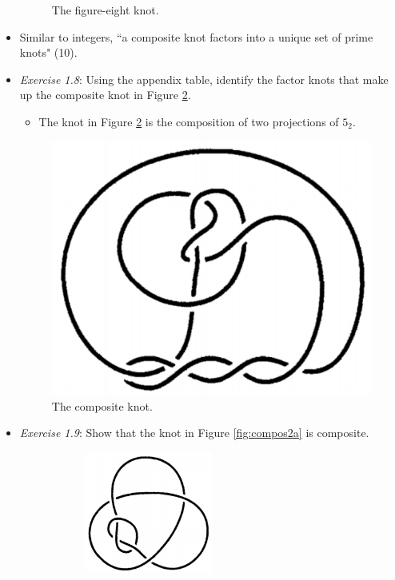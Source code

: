 \documentclass[titlepage]{article}
\numberwithin{figure}{section}
\numberwithin{table}{section}
\numberwithin{equation}{section}
\newcommand{\dq}[2]{``#1" (#2).}
\begin{document}
\begin{itemize}
\begin{figure}[h!]
        \caption{The figure-eight knot.}
        \label{fig:figure8knot}
    \end{figure}
    \item Similar to integers, \dq{a composite knot factors into a unique set of prime knots}{10}
    \item \emph{Exercise 1.8}: Using the appendix table, identify the factor knots that make up the composite knot in Figure \ref{fig:compos1}.
    \begin{itemize}
        \item The knot in Figure \ref{fig:compos1} is the composition of two projections of $5_2$.
    \end{itemize}
    \newpage
    \begin{figure}[h!]
        \centering
        \includegraphics[width=0.2\linewidth]{Blender/compos1.png}
        \caption{The composite knot.}
        \label{fig:compos1}
    \end{figure}
    \item \emph{Exercise 1.9}: Show that the knot in Figure \ref{fig:compos2a} is composite.
    \begin{figure}[h!]
        \centering
        \begin{subfigure}[b]{0.3\textwidth}
            \centering
            \includegraphics[width=0.5\textwidth]{Blender/compos2.png}

\end{subfigure}
\end{figure}
\end{itemize}
\end{document}
